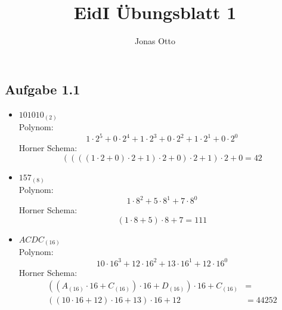 \documentclass{article}
\begin{document}
  \title{EidI Übungsblatt 1}
  \author{Jonas Otto}

  \maketitle

  \section{}
    \subsection{Aufgabe 1.1}
      \begin{itemize}
        \item $101010_{(2)}$\\
          Polynom:
          \begin{equation}
            1 \cdot 2^5 + 0 \cdot 2^4 + 1 \cdot 2^3 + 0 \cdot 2^2 + 1 \cdot 2^1 + 0 \cdot 2^0
          \end{equation}
          Horner Schema:
          \begin{equation}
            ((((1 \cdot 2 + 0) \cdot 2 + 1) \cdot 2 + 0) \cdot 2 + 1 ) \cdot 2 + 0 = 42
          \end{equation}
        \item $157_{(8)}$\\
          Polynom:
          \begin{equation}
            1 \cdot 8^2 + 5 \cdot 8^1 + 7 \cdot 8^0
          \end{equation}
          Horner Schema:
          \begin{equation}
            (1 \cdot 8 + 5) \cdot 8 + 7 = 111
          \end{equation}
        \item $ACDC_{(16)}$\\
          Polynom:
          \begin{equation}
            10 \cdot 16^3 + 12 \cdot 16^2 + 13 \cdot 16^1 + 12 \cdot 16^0
          \end{equation}
          Horner Schema:
          \begin{equation}
            \begin{aligned}
              ((A_{(16)} \cdot 16 + C_{(16)}) \cdot 16 + D_{(16)}) \cdot 16 + C_{(16)} &=\\
              ((10 \cdot 16 + 12) \cdot 16 + 13) \cdot 16 + 12 &= 44252
            \end{aligned}

\end{equation}
\end{itemize}
\end{document}
